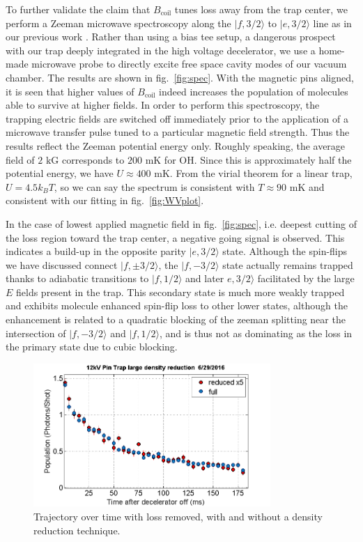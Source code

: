 \documentclass[%
 reprint,
 amsmath,amssymb,
 aps,
prl,
]{revtex4-1}
\begin{document}
To further validate the claim that $B_\text{coil}$ tunes loss away from the trap center, we perform a Zeeman microwave spectroscopy along the $|f,3/2\rangle$ to $|e,3/2\rangle$ line as in our previous work \cite{stuhl2012evap}. Rather than using a bias tee setup, a dangerous prospect with our trap deeply integrated in the high voltage decelerator, we use a home-made microwave probe to directly excite free space cavity modes of our vacuum chamber. The results are shown in fig.~\ref{fig:spec}. With the magnetic pins aligned, it is seen that higher values of $B_{\text{coil}}$ indeed increases the population of molecules able to survive at higher fields. In order to perform this spectroscopy, the trapping electric fields are switched off immediately prior to the application of a microwave transfer pulse tuned to a particular magnetic field strength. Thus the results reflect the Zeeman potential energy only. Roughly speaking, the average field of $2\text{ kG}$ corresponds to $200\text{ mK}$ for OH. Since this is approximately half the potential energy, we have $U\approx400\text{ mK}$. From the virial theorem for a linear trap, $U = 4.5k_BT$, so we can say the spectrum is consistent with $T\approx 90\text{ mK}$ and consistent with our fitting in fig.~\ref{fig:WVplot}.

In the case of lowest applied magnetic field in fig.~\ref{fig:spec}, i.e. deepest cutting of the loss region toward the trap center, a negative going signal is observed. This indicates a build-up in the opposite parity $|e,3/2\rangle$ state. Although the spin-flips we have discussed connect $|f,\pm3/2\rangle$, the $|f,-3/2\rangle$ state actually remains trapped thanks to adiabatic transitions to $|f,1/2\rangle$ and later $e,3/2\rangle$ facilitated by the large $E$ fields present in the trap. This secondary state is much more weakly trapped and exhibits molecule enhanced spin-flip loss to other lower states, although the enhancement is related to a quadratic blocking of the zeeman splitting near the intersection of $|f,-3/2\rangle$ and $|f,1/2\rangle$, and is thus not as dominating as the loss in the primary state due to cubic blocking.

\begin{figure}
\includegraphics[width=90mm]{reduce-density-compare.png}%
\caption{
Trajectory over time with loss removed, with and without a density reduction technique.
\label{fig:timetrace}}
\end{figure}
\end{document}
